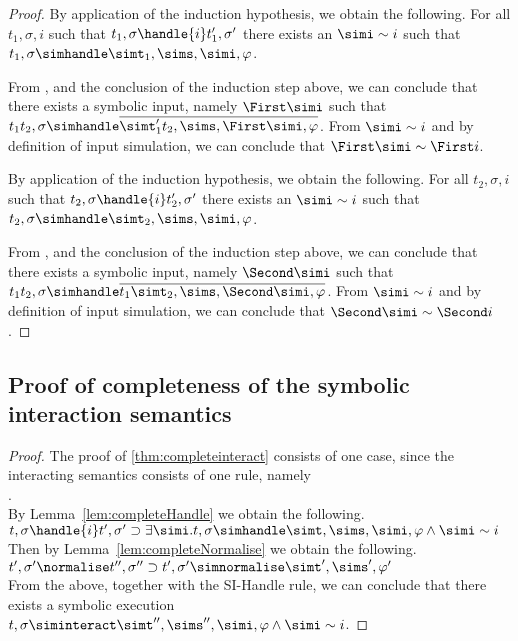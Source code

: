 \begin{proof}
    {
    By application of the induction hypothesis, we obtain the following.
    For all $t_1,\sigma,i$ such that $t_1,\sigma\handle{i}t_1',\sigma'$ there exists an $\simi\sim i$ such that $t_1,\sigma\simhandle \simt_1,\sims,\simi,\phi$.

    From , and the conclusion of the induction step above,
    we can conclude that there exists a symbolic input, namely $\First \simi$ such that $t_1\And t_2,\sigma\simhandle\overline{\simt_1'\And t_2,\sims,\First\simi,\phi}$.
    From $\simi\sim i$ and by definition of input simulation, we can conclude that $\First \simi\sim \First i$.
    }

    {
    By application of the induction hypothesis, we obtain the following.
    For all $t_2,\sigma,i$ such that $t_2,\sigma\handle{i}t_2',\sigma'$ there exists an $\simi\sim i$ such that $t_2,\sigma\simhandle \simt_2,\sims,\simi,\phi$.

    From , and the conclusion of the induction step above,
    we can conclude that there exists a symbolic input, namely $\Second \simi$ such that $t_1\And t_2,\sigma\simhandle \overline{t_1\And \simt_2,\sims,\Second\simi,\phi}$.
    From $\simi\sim i$ and by definition of input simulation, we can conclude that $\Second \simi\sim \Second i$.
    }


\end{proof}

\subsection{Proof of completeness of the symbolic interaction semantics}

\begin{proof} The proof of \cref{thm:completeinteract} consists of one case, since
  the interacting semantics consists of one rule, namely\\
  .\\
  By Lemma~\ref{lem:completeHandle} we obtain the following.\\
  $t,\sigma\handle{i} t',\sigma'\implies \exists \simi . t,\sigma\simhandle \simt,\sims,\simi,\phi \land \simi\sim i$\\
  Then by Lemma~\ref{lem:completeNormalise} we obtain the following.\\
  $t',\sigma'\normalise t'',\sigma''\implies t',\sigma'\simnormalise \simt',\sims',\phi'$\\
  From the above, together with the SI-Handle rule, we can conclude that there exists a symbolic execution $t,\sigma\siminteract \simt'',\sims'',\simi,\phi\land \simi\sim i$.

\end{proof}
